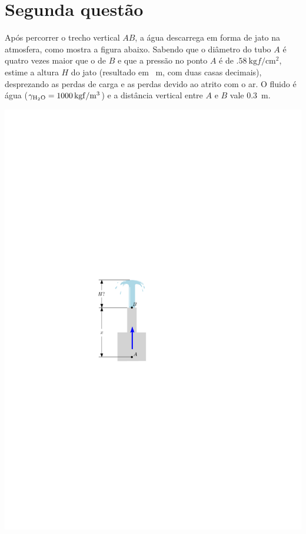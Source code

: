 \documentclass[a4paper, 12pt, brazilian]{article}
\begin{document}
	\section{Segunda questão}
	Após percorrer o trecho vertical $AB$, a água descarrega em forma de jato na atmosfera, como mostra a figura abaixo. Sabendo que o diâmetro do tubo $A$ é quatro vezes maior que o de $B$ e que a pressão no ponto $A$ é de $\SI{.58}{\kilogram f/\centi\meter^{2}}$, estime a altura $H$ do jato (resultado em \SI{}{\meter}, com duas casas decimais), desprezando as perdas de carga e as perdas devido ao atrito com o ar. O fluido é água ($\gamma_{\ce{H2O}}=\SI{1000}{\kilogram f/\meter^{3}}$)  e a distância vertical entre $A$ e $B$ vale \SI{.3}{\meter}.
	\begin{center}
		\includegraphics[width=.3\linewidth]{assets/images/ex2}
	\end{center}
\end{document}
